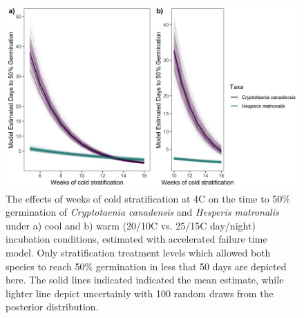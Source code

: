 \documentclass{article}\usepackage[]{graphicx}\usepackage[]{color}
\begin{document}
{\begin{figure}[h!]
    \centering
          \includegraphics[width=\textwidth]{..//figure/AFTsivansive.jpeg}
\caption{The effects of weeks of cold stratification at 4\degree C on the time to 50\% germination of \textit {Cryptotaenia canadensis} and \textit{Hesperis matronalis} under a) cool and b) warm (20/10\degree C vs. 25/15\degree C day/night) incubation conditions, estimated with accelerated failure time model. Only stratification treatment levels which allowed both species to reach 50\% germination in less that 50 days are depicted here. The solid lines indicated indicated the mean estimate, while lighter line depict uncertainly with 100 random draws from the posterior distribution.}
    \label{fig:aft}
\end{figure}


}
\end{document}
